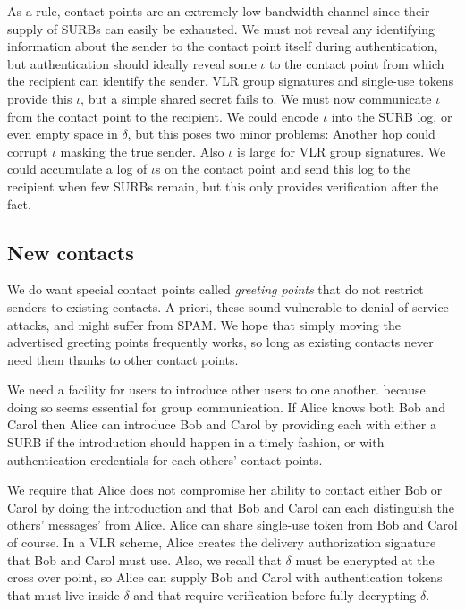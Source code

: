As a rule, contact points are an extremely low bandwidth channel
since their supply of SURBs can easily be exhausted.  We must not
reveal any identifying information about the sender to the contact 
point itself during authentication, but authentication should ideally
reveal some $\iota$ to the contact point from which the recipient
can identify the sender.  VLR group signatures and single-use tokens
provide this $\iota$, but a simple shared secret fails to.  We must
now communicate $\iota$ from the contact point to the recipient. 
We could encode $\iota$ into the SURB log, or even empty space in
$\delta$, but this poses two minor problems: 
 Another hop could corrupt $\iota$ masking the true sender.
 Also $\iota$ is large for VLR group signatures.  
We could accumulate a log of $\iota$s on the contact point and send
this log to the recipient when few SURBs remain, but this only
provides verification after the fact.



\subsection{New contacts}

We do want special contact points called {\em greeting points} that
do not restrict senders to existing contacts.  A priori, these sound
vulnerable to denial-of-service attacks, and might suffer from SPAM.
We hope that simply moving the advertised greeting points frequently
works, so long as existing contacts never need them thanks to other
contact points.

We need a facility for users to introduce other users to one another.
because doing so seems essential for group communication.  If Alice 
knows both Bob and Carol then Alice can introduce Bob and Carol by
providing each with either a SURB if the introduction should happen
in a timely fashion, or with authentication credentials for each
others' contact points.  

We require that Alice does not compromise her ability to contact
either Bob or Carol by doing the introduction and that Bob and Carol
can each distinguish the others' messages' from Alice. 
Alice can share single-use token from Bob and Carol of course.
In a VLR scheme, Alice creates the delivery authorization signature
that Bob and Carol must use.
Also, we recall that $\delta$ must be encrypted at the cross over
point, so Alice can supply Bob and Carol with authentication tokens 
that must live inside $\delta$ and that require verification before
fully decrypting $\delta$.  

 


